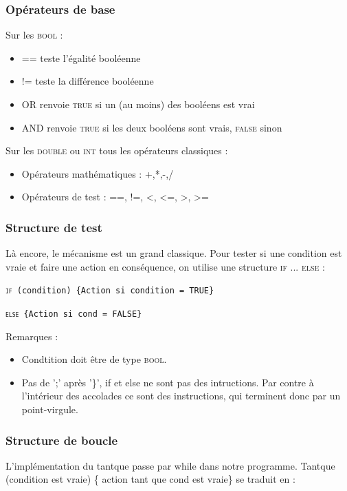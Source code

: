 \documentclass[a4paper,11pt]{article}
\begin{document}
\subsubsection{Opérateurs de base}

Sur les \textsc{bool} : 
\begin{itemize}
	\item == teste l'égalité booléenne
	\item != teste la différence booléenne 
	\item OR renvoie \textsc{true} si un (au moins) des booléens est vrai
	\item AND renvoie \textsc{true} si les deux booléens sont vrais, \textsc{false} sinon
\end{itemize}

Sur les \textsc{double} ou \textsc{int} tous les opérateurs classiques :
\begin{itemize}
	\item Opérateurs mathématiques : +,*,-,/
	\item Opérateurs de test : ==, !=, <, <=, >, >=
\end{itemize}

\subsubsection{Structure de test}
 Là encore, le mécanisme est un grand classique. Pour tester si une condition est vraie et faire une action en conséquence, on utilise une structure \textsc{if} ... \textsc{else} :

\texttt{\textsc{if} (condition) \{Action si condition = TRUE\}}

\texttt{\textsc{else}  \{Action si cond = FALSE\}}

Remarques : 
\begin{itemize}
	\item Condtition doit être de type \textsc{bool}.
	\item Pas de ';' après '\}', if et else ne sont pas des intructions. Par contre à l'intérieur des accolades ce sont des instructions, qui terminent donc par un point-virgule.
\end{itemize}

\subsubsection{Structure de boucle}
L'implémentation du tantque passe par while dans notre programme. Tantque (condition est vraie) \{ action tant que cond est vraie\} se traduit en :
\end{document}
